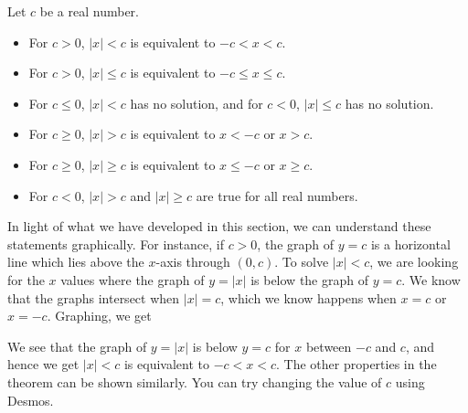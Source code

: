 \documentclass[noauthor, nooutcomes]{ximera}
\begin{document}
\begin{theorem}
Let $c$ be a real number.
\begin{itemize}

\item  For $c > 0$, $|x| < c$ is equivalent to $-c<x<c$.

\item  For $c > 0$, $|x| \leq c$ is equivalent to $-c \leq x \leq c$.

\item  For $c \leq 0$, $|x| < c$ has no solution, and for $c < 0$, $|x| \leq c$ has no solution.

\item  For $c \geq 0$, $|x| > c$ is equivalent to $x<-c$ or $x>c$.

\item  For $c \geq 0$, $|x| \geq c$ is equivalent to $x \leq -c$ or $x \geq c$.

\item  For $c < 0$, $|x| > c$ and $|x| \geq c$ are true for all real numbers.

\end{itemize}
\end{theorem}

In light of what we have developed in this section, we can understand these statements graphically. For instance, if $c > 0$, the graph of $y=c$ is a horizontal line which lies above the $x$-axis through $(0,c)$. To solve $|x| < c$, we are looking for the $x$ values where the graph of $y=|x|$ is below the graph of $y=c$. We know that the graphs intersect when $|x|=c$, which we know happens when $x=c$ or $x=-c$.  Graphing, we get

\begin{image}
\end{image}

We see that the graph of $y=|x|$ is below $y=c$ for $x$ between $-c$ and $c$, and hence we get $|x| < c$ is equivalent to $-c < x < c$. The other properties in the theorem can be shown similarly. You can try changing the value of $c$ using Desmos.
\begin{center}  
\end{center}
\end{document}
